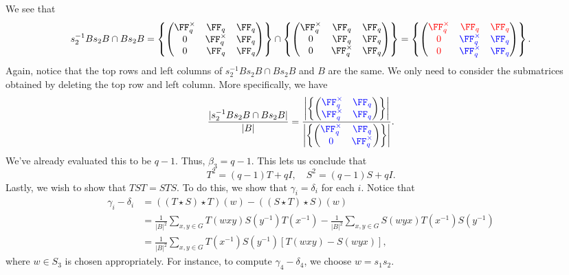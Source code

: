 \documentclass[11pt]{amsart}
\theoremstyle{remark}
\begin{document}
We see that
\[
	s_2^{-1}Bs_2B\cap Bs_2B = \left\{\begin{pmatrix}
		\FF_q^\times & \FF_q        & \FF_q \\
		0            & \FF_q^\times & \FF_q \\
		0            & \FF_q        & \FF_q
	\end{pmatrix}\right\}
	\cap
	\left\{\begin{pmatrix}
		\FF_q^\times & \FF_q        & \FF_q \\
		0            & \FF_q        & \FF_q \\
		0            & \FF_q^\times & \FF_q
	\end{pmatrix}
	\right\} =
	\left\{
	\begin{pmatrix}
		\color{red}\FF_q^\times & \color{red}\FF_q         & \color{red}\FF_q  \\
		\color{red}0            & \color{blue}\FF_q^\times & \color{blue}\FF_q \\
		\color{red}0            & \color{blue}\FF_q^\times & \color{blue}\FF_q
	\end{pmatrix}
	\right\}.
\]
Again, notice that the top rows and left columns of $s_2^{-1}Bs_2B\cap Bs_2B$ and $B$ are the same.
We only need to consider the submatrices obtained by deleting the top row and left column.
More specifically, we have
\[
	\frac{|s_2^{-1}Bs_2B\cap Bs_2B|}{|B|} = \frac{\left|\left\{\begin{pmatrix} \color{blue}\FF_q^\times & \color{blue}\FF_q \\ \color{blue}\FF_q^\times & \color{blue}\FF_q \end{pmatrix}\right\}\right|}{\left|\left\{\begin{pmatrix} \color{blue}\FF_q^\times & \color{blue}\FF_q \\ \color{blue}0 & \color{blue}\FF_q^\times \end{pmatrix}\right\}\right|}.
\]
We've already evaluated this to be $q-1$.
Thus, $\beta_3 = q-1$.
This lets us conclude that
\[
	T^2 = (q-1)T + qI,\quad S^2 = (q-1)S + qI.
\]
Lastly, we wish to show that $TST=STS$.
To do this, we show that $\gamma_i=\delta_i$ for each $i$.
Notice that
\begin{align*}
	\gamma_i-\delta_i & =  ((T\star S)\star T)(w)-((S\star T)\star S)(w)                                                                    \\
	                  & = \frac{1}{|B|^2}\sum_{x,y\in G} T(wxy)S(y^{-1})T(x^{-1}) - \frac{1}{|B|^2}\sum_{x,y\in G} S(wyx)T(x^{-1})S(y^{-1}) \\
	                  & = \frac{1}{|B|^2}\sum_{x,y\in G} T(x^{-1})S(y^{-1})[T(wxy)-S(wyx)],
\end{align*}
where $w\in S_3$ is chosen appropriately.
For instance, to compute $\gamma_4-\delta_4$, we choose $w=s_1s_2$.
\end{document}
